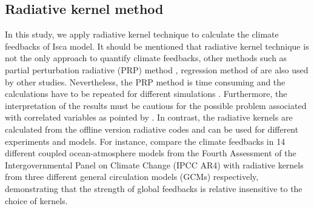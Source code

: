 \subsection{Radiative kernel method}

In this study, we apply radiative kernel  technique \citep{Soden2008,Shell2008} to calculate the climate feedbacks of Isca model. It should be mentioned that radiative kernel technique is not the only approach to quantify climate feedbacks, other methods such as partial perturbation radiative (PRP) method \citep{Wetherald1988cloud}, regression method of \cite{Gregory2004} are also used by other studies. Nevertheless, the PRP method is time consuming and the calculations have to be repeated for different simulations \citep{Shell2008}. Furthermore, the interpretation of the results must be cautious for the possible problem associated with correlated variables as pointed by \cite{Bony2006}. In contrast, the radiative kernels are calculated from the offline version radiative codes and can be used for different experiments and models. For instance, \cite{Soden2008} compare the climate feedbacks in 14 different coupled ocean-atmosphere models from the Fourth Assessment of the Intergovernmental Panel on Climate Change (IPCC AR4) with radiative kernels from three different general circulation models (GCMs) respectively, demonstrating that the strength of global feedbacks is relative insensitive to the choice of kernels.


